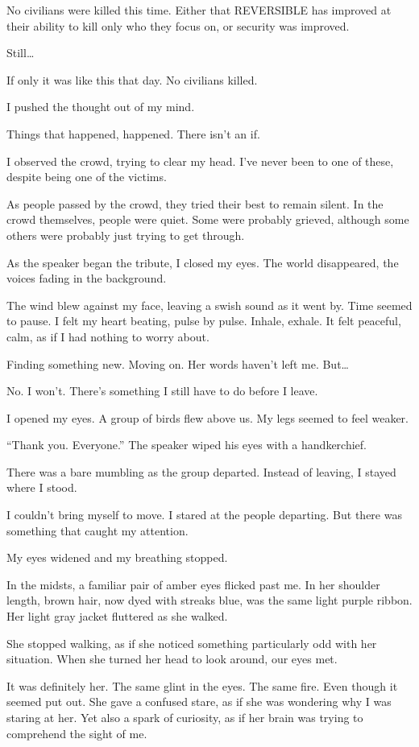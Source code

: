 No civilians were killed this time. Either that REVERSIBLE has improved at their ability to kill only who they focus on, or security was improved.

Still… 

If only it was like this that day. No civilians killed.

I pushed the thought out of my mind. 

Things that happened, happened. There isn’t an if. 

I observed the crowd, trying to clear my head. I’ve never been to one of these, despite being one of the victims.

As people passed by the crowd, they tried their best to remain silent. In the crowd themselves, people were quiet. Some were probably grieved, although some others were probably just trying to get through. 

As the speaker began the tribute, I closed my eyes. The world disappeared, the voices fading in the background.

The wind blew against my face, leaving a swish sound as it went by. Time seemed to pause. I felt my heart beating, pulse by pulse. Inhale, exhale. It felt peaceful, calm, as if I had nothing to worry about. 

Finding something new. Moving on. Her words haven’t left me. But…

No. I won’t. There’s something I still have to do before I leave.

I opened my eyes. A group of birds flew above us. My legs seemed to feel weaker.

“Thank you. Everyone.” The speaker wiped his eyes with a handkerchief. 

There was a bare mumbling as the group departed. Instead of leaving, I stayed where I stood. 

I couldn’t bring myself to move. I stared at the people departing. But there was something that caught my attention.

My eyes widened and my breathing stopped.

In the midsts, a familiar pair of amber eyes flicked past me. In her shoulder length, brown hair, now dyed with streaks blue, was the same light purple ribbon. Her light gray jacket fluttered as she walked.

She stopped walking, as if she noticed something particularly odd with her situation. When she turned her head to look around, our eyes met.

It was definitely her. The same glint in the eyes. The same fire. Even though it seemed put out. She gave a confused stare, as if she was wondering why I was staring at her. Yet also a spark of curiosity, as if her brain was trying to comprehend the sight of me.

